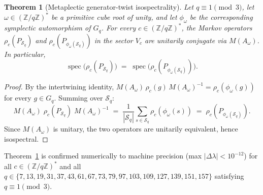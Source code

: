 \documentclass[11pt,a4paper]{article}
\newtheorem{theorem}{Theorem}[section]
\theoremstyle{definition}
\theoremstyle{remark}
\newcommand{\Gq}{G_q}
\newcommand{\Z}{\mathbb{Z}}
\newcommand{\Sq}{\mathcal{S}_q}
\begin{document}
      \begin{theorem}[Metaplectic generator-twist isospectrality]
        \label{thm:generator-twist-isospectrality}
        Let $q \equiv 1 \pmod{3}$, let $\omega \in (\Z/q\Z)^*$ be a primitive cube root of unity, and
        let $\phi_\omega$ be the corresponding symplectic automorphism of $\Gq$.
        For every $c \in (\Z/q\Z)^*$, the Markov operators
        $\rho_c(P_{\Sq})$ and $\rho_c(P_{\phi_\omega(\Sq)})$ in the sector $V_c$ are unitarily
        conjugate via $M(A_\omega)$.
        In particular,
        \begin{equation}
          \label{eq:isospectrality}
          \operatorname{spec}\bigl(\rho_c(P_{\Sq})\bigr)
          \;=\;
          \operatorname{spec}\bigl(\rho_c(P_{\phi_\omega(\Sq)})\bigr).
        \end{equation}
      \end{theorem}

      \begin{proof}
        By the intertwining identity, $M(A_\omega)\,\rho_c(g)\,M(A_\omega)^{-1} = \rho_c(\phi_\omega(g))$
        for every $g \in \Gq$.
        Summing over $\Sq$:
        \[
          M(A_\omega)\;\rho_c(P_{\Sq})\;M(A_\omega)^{-1}
          \;=\; \frac{1}{|\Sq|}\sum_{s\in\Sq} \rho_c(\phi_\omega(s))
          \;=\; \rho_c(P_{\phi_\omega(\Sq)}).
        \]
        Since $M(A_\omega)$ is unitary, the two operators are unitarily equivalent, hence isospectral.
      \end{proof}

      Theorem~\ref{thm:generator-twist-isospectrality} is confirmed numerically to machine precision
      (max $|\Delta\lambda| < 10^{-12}$) for all $c \in (\Z/q\Z)^*$ and all $q \in \{7,13,19,31,37,
  43,61,67,73,79,97,103,109,127,139,151,157\}$ satisfying $q \equiv 1 \pmod{3}$.
\end{document}
